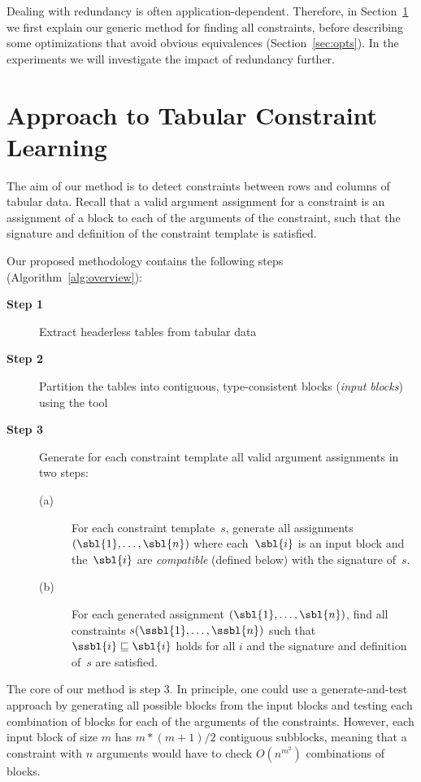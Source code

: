 Dealing with redundancy is often application-dependent.
Therefore, in Section~\ref{sec:approach} we first explain our generic method for finding all constraints, before describing some optimizations that avoid obvious equivalences (Section~\ref{sec:opts}).
In the experiments we will investigate the impact of redundancy further.





\newcommand{\tcl}{Tabular Constraint Learning}
\section{Approach to Tabular Constraint Learning}\label{sec:approach}
The aim of our method is to detect constraints between rows and columns of tabular data. Recall that a valid argument assignment for a constraint is an assignment of a block to each of the arguments of the constraint, such that the signature and definition of the constraint template is satisfied.

Our proposed methodology contains the following steps (Algorithm~\ref{alg:overview}):
\begin{algorithm}
\begin{description}
\item[\textbf{Step 1}] Extract headerless tables from tabular data
\item[\textbf{Step 2}] Partition the tables into contiguous, type-consistent blocks (\textit{input blocks}) using the \ecblockdetect{} tool
\item[\textbf{Step 3}] Generate for each constraint template all valid argument assignments in two steps:
\begin{description}
\item[(a)] For each constraint template~$s$, generate all assignments $(\sbl{1}, \ldots ,\sbl{n})$ where each~$\sbl{i}$ is an input block and the~$\sbl{i}$ are \textit{compatible} (defined below) with the signature of~$s$. 
\item[(b)] For each generated assignment $(\sbl{1}, \ldots ,\sbl{n})$, find all constraints $s(\ssbl{1}, \ldots, \ssbl{n})$ such that $\ssbl{i} \sqsubseteq \sbl{i}$ holds for all $i$ and the signature and definition of~$s$ are satisfied.
\end{description}
\end{description}
\caption{}
\label{alg:overview}
\end{algorithm}

The core of our method is step 3. In principle, one could use a generate-and-test approach by generating all possible blocks from the input blocks and testing each combination of blocks for each of the arguments of the constraints.
However, each input block of size $m$ has $m*(m+1)/2$ contiguous subblocks, meaning that a constraint with $n$ arguments would have to check $O(n^{m^2})$ combinations of blocks.

